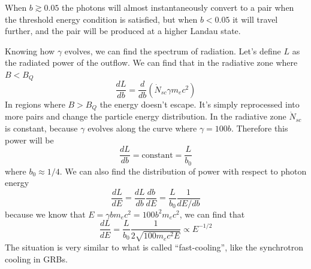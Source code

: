 \documentclass[letterpaper, 11pt]{article}
\numberwithin{equation}{section}
\numberwithin{figure}{section}
\begin{document}
When $b \gtrsim 0.05$ the photons will almost instantaneously convert to a pair when the threshold energy condition is satisfied, but when $b < 0.05$ it will travel further, and the pair will be produced at a higher Landau state.

Knowing how $\gamma$ evolves, we can find the spectrum of radiation. Let's define $L$ as the radiated power of the outflow. We can find that in the radiative zone where $B < B_Q$
\begin{equation}
    \label{eq:95}
    \frac{dL}{db} = \frac{d}{db} \left( \dot{N}_{sc}\gamma m_ec^2 \right)
\end{equation}
In regions where $B > B_Q$ the energy doesn't escape. It's simply reprocessed into more pairs and change the particle energy distribution. In the radiative zone $\dot{N}_{sc}$ is constant, because $\gamma$ evolves along the curve where $\gamma = 100 b$. Therefore this power will be
\begin{equation}
    \label{eq:96}
    \frac{dL}{db} = \mathrm{constant} = \frac{L}{b_0}
\end{equation}
where $b_0 \approx 1/4$. We can also find the distribution of power with respect to photon energy
\begin{equation}
    \label{eq:97}
    \frac{dL}{dE} = \frac{dL}{db}\frac{db}{dE} = \frac{L}{b_0} \frac{1}{dE/db}
\end{equation}
because we know that $E = \gamma b m_ec^2 = 100b^2m_ec^2$, we can find that
\begin{equation}
    \label{eq:98}
    \frac{dL}{dE} = \frac{L}{b_0}\frac{1}{2\sqrt{100 m_ec^2E}} \propto E^{-1/2}
\end{equation}
The situation is very similar to what is called ``fast-cooling'', like the synchrotron cooling in GRBs.
\end{document}

